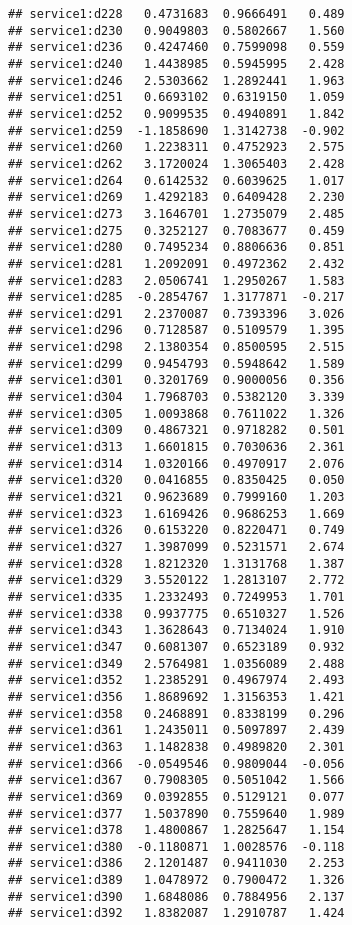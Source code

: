 \documentclass[
]{article}
\begin{document}
\begin{verbatim}
## service1:d228   0.4731683  0.9666491   0.489
## service1:d230   0.9049803  0.5802667   1.560
## service1:d236   0.4247460  0.7599098   0.559
## service1:d240   1.4438985  0.5945995   2.428
## service1:d246   2.5303662  1.2892441   1.963
## service1:d251   0.6693102  0.6319150   1.059
## service1:d252   0.9099535  0.4940891   1.842
## service1:d259  -1.1858690  1.3142738  -0.902
## service1:d260   1.2238311  0.4752923   2.575
## service1:d262   3.1720024  1.3065403   2.428
## service1:d264   0.6142532  0.6039625   1.017
## service1:d269   1.4292183  0.6409428   2.230
## service1:d273   3.1646701  1.2735079   2.485
## service1:d275   0.3252127  0.7083677   0.459
## service1:d280   0.7495234  0.8806636   0.851
## service1:d281   1.2092091  0.4972362   2.432
## service1:d283   2.0506741  1.2950267   1.583
## service1:d285  -0.2854767  1.3177871  -0.217
## service1:d291   2.2370087  0.7393396   3.026
## service1:d296   0.7128587  0.5109579   1.395
## service1:d298   2.1380354  0.8500595   2.515
## service1:d299   0.9454793  0.5948642   1.589
## service1:d301   0.3201769  0.9000056   0.356
## service1:d304   1.7968703  0.5382120   3.339
## service1:d305   1.0093868  0.7611022   1.326
## service1:d309   0.4867321  0.9718282   0.501
## service1:d313   1.6601815  0.7030636   2.361
## service1:d314   1.0320166  0.4970917   2.076
## service1:d320   0.0416855  0.8350425   0.050
## service1:d321   0.9623689  0.7999160   1.203
## service1:d323   1.6169426  0.9686253   1.669
## service1:d326   0.6153220  0.8220471   0.749
## service1:d327   1.3987099  0.5231571   2.674
## service1:d328   1.8212320  1.3131768   1.387
## service1:d329   3.5520122  1.2813107   2.772
## service1:d335   1.2332493  0.7249953   1.701
## service1:d338   0.9937775  0.6510327   1.526
## service1:d343   1.3628643  0.7134024   1.910
## service1:d347   0.6081307  0.6523189   0.932
## service1:d349   2.5764981  1.0356089   2.488
## service1:d352   1.2385291  0.4967974   2.493
## service1:d356   1.8689692  1.3156353   1.421
## service1:d358   0.2468891  0.8338199   0.296
## service1:d361   1.2435011  0.5097897   2.439
## service1:d363   1.1482838  0.4989820   2.301
## service1:d366  -0.0549546  0.9809044  -0.056
## service1:d367   0.7908305  0.5051042   1.566
## service1:d369   0.0392855  0.5129121   0.077
## service1:d377   1.5037890  0.7559640   1.989
## service1:d378   1.4800867  1.2825647   1.154
## service1:d380  -0.1180871  1.0028576  -0.118
## service1:d386   2.1201487  0.9411030   2.253
## service1:d389   1.0478972  0.7900472   1.326
## service1:d390   1.6848086  0.7884956   2.137
## service1:d392   1.8382087  1.2910787   1.424

\end{verbatim}
\end{document}
